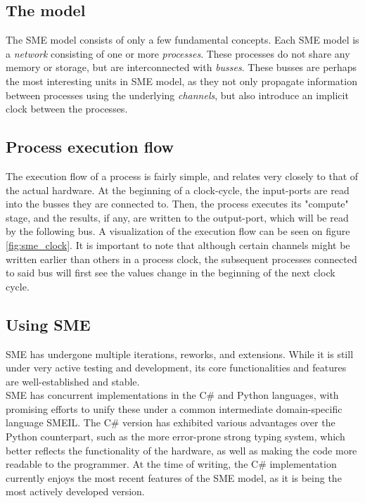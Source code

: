 \subsection{The model} The SME model consists of only a few fundamental
concepts. Each SME model is a \textit{network} consisting of one or more
\textit{processes}. These processes do not share any memory or storage,
but are interconnected with \textit{busses}.  These busses are perhaps
the most interesting units in SME model, as they not only propagate
information between processes using the underlying \textit{channels},
but also introduce an implicit clock between the processes.\\

\subsection{Process execution flow} The execution flow of a process is
fairly simple, and relates very closely to that of the actual hardware. At
the beginning of a clock-cycle, the input-ports are read into the busses
they are connected to. Then, the process executes its "compute" stage, and
the results, if any, are written to the output-port, which will be read
by the following bus. A visualization of the execution flow can be seen
on figure \ref{fig:sme_clock}.  
It is important to note that although certain channels might be written earlier
than others in a process clock, the subsequent processes connected to said bus 
will first see the values change in the beginning of the next clock cycle.


\subsection{Using SME}
SME has undergone multiple iterations, reworks, and extensions. While it is still
under very active testing and development, its core functionalities and features
 are well-established and stable\cite{bus_centric_sme}.\\
SME has concurrent implementations in the C\# and Python languages, with promising
efforts to unify these under a common intermediate domain-specific language 
SMEIL\cite{smeil}. The C\# version has exhibited various advantages over the 
Python counterpart, such as the more error-prone strong typing system, which 
better reflects the functionality of the hardware, as well as making the code
more readable to the programmer. At the time of writing, the C\# implementation currently
enjoys the most recent features of the SME model, as it is being the most actively 
developed version. 

